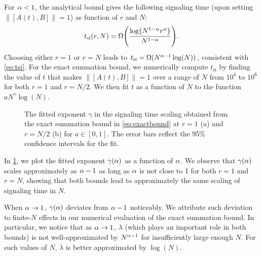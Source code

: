 For $\alpha < 1$, the analytical bound gives the following signaling time (upon setting $\|[A(t),B]\|= 1$) as function of $r$ and $N$:
\begin{equation}
	\label{eq:contour_al<d}
	t_\text{si}(r,N) =\W{\frac{\log(N^{1-\al}r^{\al})}{N^{1-\al}}}.
\end{equation}
Choosing either $r=1$ or $r=N$ leads to $t_\text{si}=\Omega(N^{\alpha-1}\log(N))$, consistent with \cref{eq:tsi}. For the exact summation bound, we numerically compute $t_\text{si}$ by finding the value of $t$ that makes $\|[A(t),B]\| = 1$ over a range of $N$ from $10^4$ to $10^6$ for both $r = 1$ and $r = N/2$. We then fit $t$ as a function of $N$ to the function $a N^\gamma \log(N)$.
\begin{figure}[h]
	 \qquad
	\caption{The fitted exponent $\gamma$ in the signaling time scaling obtained from the exact summation bound in \cref{eq:exactbound} at $r=1$ (a) and $r=N/2$ (b) for $a\in [0,1]$. The error bars reflect the 95\% confidence intervals for the fit.}
        \label{Fig_al<d}
\end{figure}
In \cref{Fig_al<d}, we plot the fitted exponent $\gamma(\alpha)$ as a function of $\alpha$. We observe that $\gamma(\alpha)$ scales approximately as $\alpha-1$ as long as $\alpha$ is not close to 1 for both $r=1$ and $r=N$, showing that both bounds lead to approximately the same scaling of signaling time in $N$.

When $\alpha\rightarrow 1$, $\gamma(\alpha)$ deviates from $\alpha-1$ noticeably. We attribute such deviation to finite-$N$ effects in our numerical evaluation of the exact summation bound. In particular, we notice that as $\alpha\rightarrow 1$, $\lambda$ (which plays an important role in both bounds) is not well-approximated by $N^{\alpha-1}$ for insufficiently large enough $N$. For such values of $N$, $\lambda$ is better approximated by $\log(N)$.


